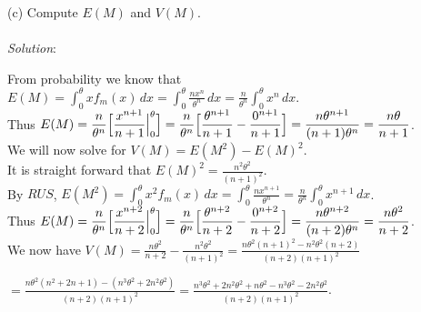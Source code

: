 \documentclass[12pt]{article}
\newcommand{\XB}{\color{black}}
\newcommand{\XV}{\color{violet}}
\begin{document}

(c) Compute $ E(M) $ and $ V(M) $. \\
\vspace{2.5mm} \\
\textit{Solution}:
\vspace{2.5mm}

\noindent 
From probability we know that $ \displaystyle E(M) = \int_{0}^{\theta} xf_{m}(x) \, dx = \int_{0}^{\theta} \frac{nx^{n}}{\theta^{n}} \, dx = \frac{n}{\theta^{n}} \int_{0}^{\theta} x^{n} \, dx $. \\

\noindent 
Thus $ \displaystyle E(M) = \frac{n}{\theta^{n}} \Bigl[ \frac{x^{n + 1}}{n + 1} \Big|_{0}^{\theta} \Bigr] = \frac{n}{\theta^{n}} \Bigl[ \frac{\theta^{n + 1}}{n + 1} - \frac{0^{n + 1}}{n + 1} \Bigr] = \frac{n\theta^{n + 1}}{(n + 1)\theta^{n}} = \frac{n\theta}{n + 1} $. \\

\noindent 
We will now solve for $ V(M) = E(M^{2}) - E(M)^{2} $. \\

\noindent 
It is straight forward that $ \displaystyle E(M)^{2} = \frac{n^{2}\theta^{2}}{(n + 1)^{2}} $. \\

\noindent 
By $ RUS $, $ \displaystyle E(M^{2}) = \int_{0}^{\theta} x^{2}f_{m}(x) \, dx = \int_{0}^{\theta} \frac{nx^{n+1}}{\theta^{n}} = \frac{n}{\theta^{n}} \int_{0}^{\theta} x^{n + 1} \, dx $. \\

\noindent
Thus $ \displaystyle E(M) = \frac{n}{\theta^{n}} \Bigl[ \frac{x^{n + 2}}{n + 2} \Big|_{0}^{\theta} \Bigr] = \frac{n}{\theta^{n}} \Bigl[ \frac{\theta^{n + 2}}{n + 2} - \frac{0^{n + 2}}{n + 2} \Bigr] = \frac{n\theta^{n + 2}}{(n + 2)\theta^{n}} = \frac{n\theta^{2}}{n + 2} $. \\

\noindent 
We now have $ \displaystyle V(M) = \frac{n\theta^{2}}{n + 2} - \frac{n^{2}\theta^{2}}{(n + 1)^{2}} = \frac{n\theta^{2}(n + 1)^{2} - n^{2}\theta^{2}(n + 2)}{(n + 2)(n + 1)^{2}} $ 

$ \displaystyle = \frac{n\theta^{2}(n^{2} + 2n + 1) - (n^{3}\theta^{2} + 2n^{2}\theta^{2})}{(n + 2)(n + 1)^{2}} = \frac{n^{3}\theta^{2} + 2n^{2}\theta^{2} + n\theta^{2} - n^{3}\theta^{2} - 2n^{2}\theta^{2}}{(n + 2)(n + 1)^{2}} $. 
\end{document}
